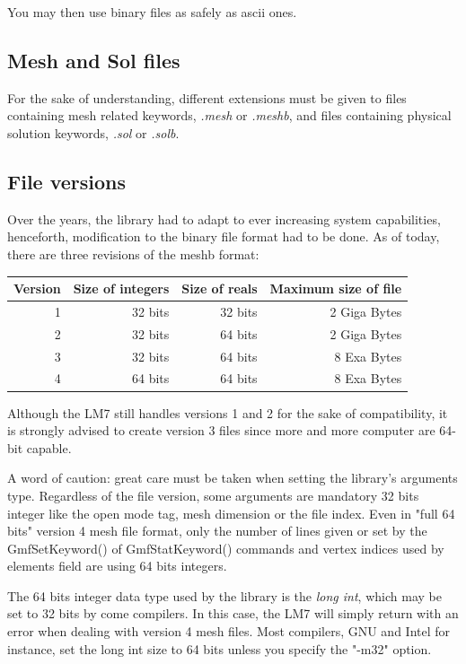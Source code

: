\documentclass[a4paper,12pt]{article}
\begin{document}
You may then use binary files as safely as ascii ones.

\subsection{Mesh and Sol files}
For the sake of understanding, different extensions must be given to files containing mesh related keywords, \emph{.mesh} or \emph{.meshb}, and files containing physical solution keywords, \emph{.sol} or \emph{.solb}.

\subsection{File versions}
Over the years, the library had to adapt to ever increasing system capabilities, henceforth, modification to the binary file format had to be done. As of today, there are three revisions of the meshb format:
\medskip

\begin{tabular}{|r|r|r|r|}
\hline
Version & Size of integers & Size of reals & Maximum size of file \\
\hline
1 & 32 bits & 32 bits & 2 Giga Bytes \\
\hline
2 & 32 bits & 64 bits & 2 Giga Bytes \\
\hline
3 & 32 bits & 64 bits & 8 Exa Bytes \\
\hline
4 & 64 bits & 64 bits & 8 Exa Bytes \\
\hline
\end{tabular}
\medskip

Although the LM7 still handles versions 1 and 2 for the sake of compatibility, it is strongly advised to create version 3 files since more and more computer are 64-bit capable.

A word of caution: great care must be taken when setting the library's arguments type. Regardless of the file version, some arguments are mandatory 32 bits integer like the open mode tag, mesh dimension or the file index. Even in "full 64 bits" version 4 mesh file format, only the number of lines given or set by the GmfSetKeyword() of GmfStatKeyword() commands and vertex indices used by elements field are using 64 bits integers.

The 64 bits integer data type used by the library is the \emph{long int}, which may be set to 32 bits by come compilers. In this case, the LM7 will simply return with an error when dealing with version 4 mesh files. Most compilers, GNU and Intel for instance, set the long int size to 64 bits unless you specify the "-m32" option.
\end{document}
